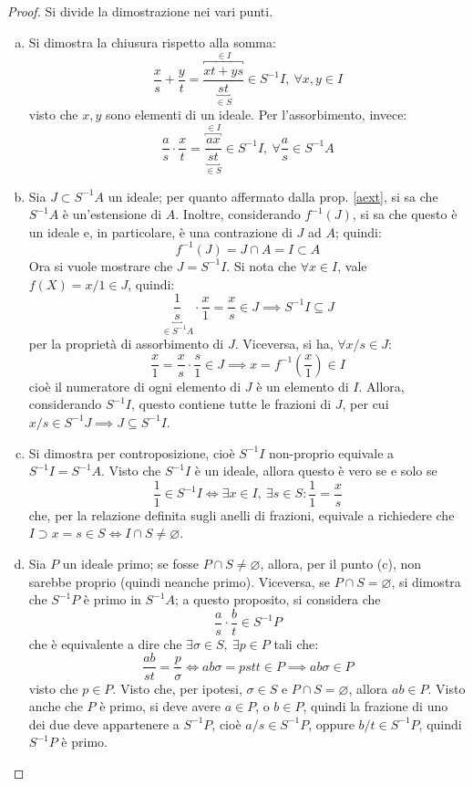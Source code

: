 \documentclass[11pt]{article}
\theoremstyle{style}
\numberwithin{equation}{subsection}
\begin{document}
	\begin{proof}
		Si divide la dimostrazione nei vari punti.
		\begin{enumerate}[(a).]
			\item Si dimostra la chiusura rispetto alla somma:
				\[
					\frac{x}{s} + \frac{y}{t} = \frac{\overbracket{xt + ys}^{\in I} }{\underbracket{st}_{\in S} }\in S^{-1}I, \ \forall x,y \in I
				\] 
				visto che $x,y$ sono elementi di un ideale.
				Per l'assorbimento, invece:
\[
	\frac{a}{s}\cdot \frac{x}{t} = \frac{\overbracket{ax}^{\in I} }{\underbracket{st}_{\in S} } \in S^{-1}I , \ \forall \frac{a}{s}\in S^{-1}A
\] 
\item Sia $J \subset S^{-1}A$ un ideale; per quanto affermato dalla prop. \ref{aext}, si sa che $S^{-1}A$ \`e un'estensione di $A$.
	Inoltre, considerando $f^{-1}(J)$, si sa che questo \`e un ideale e, in particolare, \`e una contrazione di $J$ ad $A$; quindi:
	\[
	f^{-1}(J) = J\cap A = I \subset A
	\] 
	Ora si vuole mostrare che $J = S^{-1}I$.
	Si nota che $\forall x \in I$, vale $f(X) = x / 1 \in J$, quindi:
	\[
		\underbracket{\frac{1}{s} }_{\in S^{-1}A} \cdot \frac{x}{1}= \frac{x}{s} \in J\implies S^{-1}I \subseteq J
	\] 
	per la propriet\`a di assorbimento di $J$.
	Viceversa, si ha, $\forall x / s \in J$:
	\[
	\frac{x}{1} = \frac{x}{s} \cdot \frac{s}{1} \in J\implies x = f^{-1}\left(\frac{x}{1}\right) \in I
	\] 
	cio\`e il numeratore di ogni elemento di $J$ \`e un elemento di $I$.
	Allora, considerando $S^{-1}I$, questo contiene tutte le frazioni di $J$, per cui $x /s \in S^{-1}J \implies J \subseteq S^{-1}I$.
\item Si dimostra per controposizione, cio\`e $S^{-1}I$ non-proprio equivale a $S^{-1}I = S^{-1}A$.
	Visto che $S^{-1}I$ \`e un ideale, allora questo \`e vero se e solo se 
	\[
	\frac{1}{1} \in S^{-1}I \iff \exists x \in I, \ \exists s \in S : \frac{1}{1} = \frac{x}{s}
	\] 
	che, per la relazione definita sugli anelli di frazioni, equivale a richiedere che $I \supset x = s \in S \iff I \cap S \neq \varnothing$.
\item Sia $P$ un ideale primo; se fosse $P\cap S \neq \varnothing$, allora, per il punto (c), non sarebbe proprio (quindi neanche primo).
	Viceversa, se $P \cap S = \varnothing$, si dimostra che $S^{-1}P$ \`e primo in $S^{-1}A$; a questo proposito, si considera che
\[
\frac{a}{s}\cdot \frac{b}{t} \in S^{-1}P
\] 
che \`e equivalente a dire che $\exists \sigma \in S, \ \exists p \in P$ tali che:
\[
\frac{ab}{st} = \frac{p}{\sigma } \iff ab\sigma = p st t\in P \implies ab \sigma  \in P
\] 
visto che $p \in P$.
Visto che, per ipotesi, $\sigma \in S$ e $P\cap S = \varnothing$, allora $ab \in P$.
Visto anche che $P$ \`e primo, si deve avere $a \in P$, o $b \in P$, quindi la frazione di uno dei due deve appartenere a $S^{-1}P$, cio\`e $a / s \in S^{-1}P$, oppure $b / t \in S^{-1}P$, quindi $S^{-1}P$ \`e primo.
		\end{enumerate}
	\end{proof}
\end{document}
